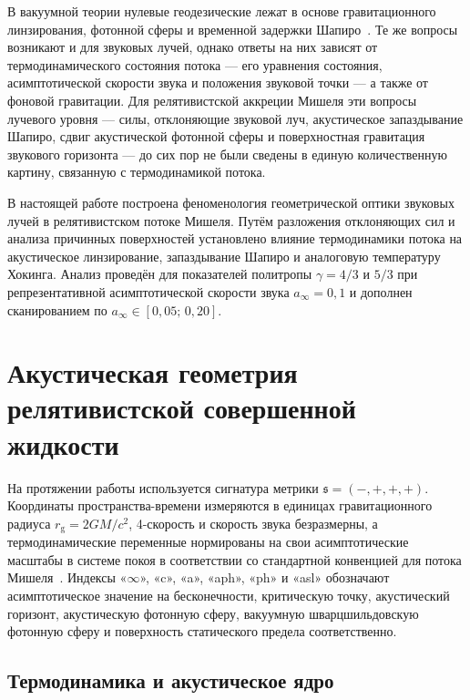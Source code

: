 \documentclass[12pt,a4paper,preprint]{elsarticle}
\begin{document}
        В вакуумной теории нулевые геодезические лежат в основе гравитационного линзирования, фотонной сферы и временной задержки Шапиро~\cite{ShapiroII_FourthTestOfGeneralRelativity_1964}. Те же вопросы возникают и для звуковых лучей, однако ответы на них зависят от термодинамического состояния потока --- его уравнения состояния, асимптотической скорости звука и положения звуковой точки --- а также от фоновой гравитации. Для релятивистской аккреции Мишеля эти вопросы лучевого уровня --- силы, отклоняющие звуковой луч, акустическое запаздывание Шапиро, сдвиг акустической фотонной сферы и поверхностная гравитация звукового горизонта --- до сих пор не были сведены в единую количественную картину, связанную с термодинамикой потока.
        
        В настоящей работе построена феноменология геометрической оптики звуковых лучей в релятивистском потоке Мишеля. Путём разложения отклоняющих сил и анализа причинных поверхностей установлено влияние термодинамики потока на акустическое линзирование, запаздывание Шапиро и аналоговую температуру Хокинга. Анализ проведён для показателей политропы $\gamma=4/3$ и $5/3$ при репрезентативной асимптотической скорости звука $a_{\infty}=0{,}1$ и дополнен сканированием по $a_{\infty}\in[0{,}05;\,0{,}20]$.

    \section{Акустическая геометрия релятивистской совершенной жидкости}\label{sec:acoustic-geometry-fluid}

        На протяжении работы используется сигнатура метрики $\mathfrak{s}=(-,+,+,+)$. Координаты пространства-времени измеряются в единицах гравитационного радиуса $r_{\mathrm{g}}=2GM/c^{2}$, 4-скорость и скорость звука безразмерны, а термодинамические переменные нормированы на свои асимптотические масштабы в системе покоя в соответствии со стандартной конвенцией для потока Мишеля~\cite{MichelFC_AccretionOfMatterByCondensedObjects_1972, MoncriefV_StabilityOfStationarySphericalAccretionOntoASchwarzschildBlackHole_1980}. Индексы «$\infty$», «c», «a», «aph», «ph» и «asl» обозначают асимптотическое значение на бесконечности, критическую точку, акустический горизонт, акустическую фотонную сферу, вакуумную шварцшильдовскую фотонную сферу и поверхность статического предела соответственно.

        \subsection{Термодинамика и акустическое ядро}\label{subsec:acoustic-core}
\end{document}
